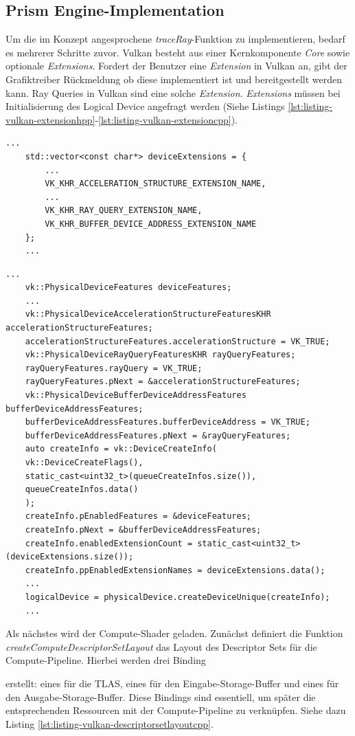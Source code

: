 \documentclass[11pt]{scrartcl}
\begin{document}
{	\subsection{Prism Engine-Implementation}

	Um die im Konzept angesprochene \textit{traceRay}-Funktion zu implementieren, bedarf es mehrerer Schritte zuvor. Vulkan besteht aus einer Kernkomponente \textit{Core} sowie optionale \textit{Extensions}. Fordert der Benutzer eine \textit{Extension} in Vulkan an, gibt der Grafiktreiber Rückmeldung ob diese implementiert ist und bereitgestellt werden kann. 
	Ray Queries in Vulkan sind eine solche \textit{Extension}. \textit{Extensions} müssen bei Initialisierung des Logical Device angefragt werden (Siehe Listings \ref{lst:listing-vulkan-extensionhpp}-\ref{lst:listing-vulkan-extensioncpp}). 
	
	\begin{lstlisting}[caption={Definition der Raytracing Extensions in VulkanRenderer.hpp},label={lst:listing-vulkan-extensionhpp}]
	...
	std::vector<const char*> deviceExtensions = {
		...
		VK_KHR_ACCELERATION_STRUCTURE_EXTENSION_NAME,
		...
		VK_KHR_RAY_QUERY_EXTENSION_NAME,
		VK_KHR_BUFFER_DEVICE_ADDRESS_EXTENSION_NAME
	};
	...\end{lstlisting}
	
	\begin{lstlisting}[caption={Anfragen der Raytracing Extensions in VulkanRenderer.cpp},label={lst:listing-vulkan-extensioncpp}]
	...
    vk::PhysicalDeviceFeatures deviceFeatures;
	...
	vk::PhysicalDeviceAccelerationStructureFeaturesKHR accelerationStructureFeatures;
	accelerationStructureFeatures.accelerationStructure = VK_TRUE;
	vk::PhysicalDeviceRayQueryFeaturesKHR rayQueryFeatures;
	rayQueryFeatures.rayQuery = VK_TRUE;
	rayQueryFeatures.pNext = &accelerationStructureFeatures;
	vk::PhysicalDeviceBufferDeviceAddressFeatures bufferDeviceAddressFeatures;
	bufferDeviceAddressFeatures.bufferDeviceAddress = VK_TRUE;
	bufferDeviceAddressFeatures.pNext = &rayQueryFeatures;
	auto createInfo = vk::DeviceCreateInfo(
	vk::DeviceCreateFlags(),
	static_cast<uint32_t>(queueCreateInfos.size()),
	queueCreateInfos.data()
	);
	createInfo.pEnabledFeatures = &deviceFeatures;
	createInfo.pNext = &bufferDeviceAddressFeatures;
	createInfo.enabledExtensionCount = static_cast<uint32_t>(deviceExtensions.size());
	createInfo.ppEnabledExtensionNames = deviceExtensions.data();
	...
	logicalDevice = physicalDevice.createDeviceUnique(createInfo);
	...\end{lstlisting}
	
	Als nächstes wird der Compute-Shader geladen. Zunächst definiert die Funktion \textit{createComputeDescriptorSetLayout} das Layout des Descriptor Sets für die Compute-Pipeline. Hierbei werden drei Binding} erstellt: eines für die TLAS, eines für den Eingabe-Storage-Buffer und eines für den Ausgabe-Storage-Buffer. Diese Bindings sind essentiell, um später die entsprechenden Ressourcen mit der Compute-Pipeline zu verknüpfen. Siehe dazu Listing \ref{lst:listing-vulkan-descriptorsetlayoutcpp}.
	
\end{document}
